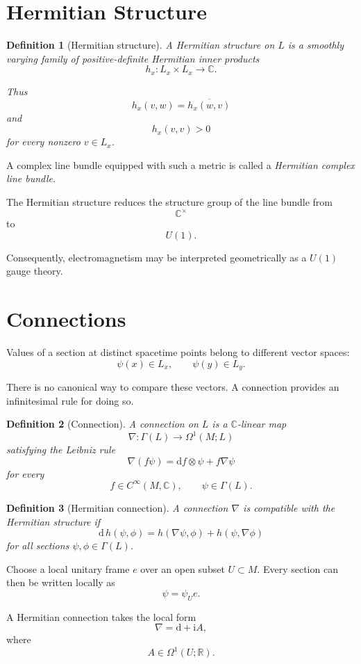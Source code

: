 \documentclass[11pt,a4paper]{article}
\newtheorem{definition}{Definition}[section]
\newcommand{\R}{\mathbb{R}}
\newcommand{\C}{\mathbb{C}}
\newcommand{\ii}{\mathrm{i}}
\newcommand{\dd}{\mathrm{d}}
\begin{document}
\section{Hermitian Structure}

\begin{definition}[Hermitian structure]
A \emph{Hermitian structure} on $L$ is a smoothly varying family of
positive-definite Hermitian inner products
\[
h_x:L_x\times L_x\longrightarrow\C.
\]

Thus
\[
h_x(v,w)=\overline{h_x(w,v)}
\]
and
\[
h_x(v,v)>0
\]
for every nonzero $v\in L_x$.
\end{definition}

A complex line bundle equipped with such a metric is called a
\emph{Hermitian complex line bundle}.

The Hermitian structure reduces the structure group of the line
bundle from
\[
\C^\times
\]
to
\[
U(1).
\]

Consequently, electromagnetism may be interpreted geometrically as
a $U(1)$ gauge theory.

\section{Connections}

Values of a section at distinct spacetime points belong to different
vector spaces:
\[
\psi(x)\in L_x,
\qquad
\psi(y)\in L_y.
\]

There is no canonical way to compare these vectors. A connection
provides an infinitesimal rule for doing so.

\begin{definition}[Connection]
A connection on $L$ is a $\C$-linear map
\[
\nabla:\Gamma(L)
\longrightarrow
\Omega^1(M;L)
\]
satisfying the Leibniz rule
\[
\nabla(f\psi)
=
\dd f\otimes\psi
+
f\nabla\psi
\]
for every
\[
f\in C^\infty(M,\C),
\qquad
\psi\in\Gamma(L).
\]
\end{definition}

\begin{definition}[Hermitian connection]
A connection $\nabla$ is compatible with the Hermitian structure
if
\[
\dd\,h(\psi,\phi)
=
h(\nabla\psi,\phi)
+
h(\psi,\nabla\phi)
\]
for all sections $\psi,\phi\in\Gamma(L)$.
\end{definition}

Choose a local unitary frame $e$ over an open subset $U\subset M$.
Every section can then be written locally as
\[
\psi=\psi_U e.
\]

A Hermitian connection takes the local form
\[
\nabla
=
\dd+\ii A,
\]
where
\[
A\in\Omega^1(U;\R).
\]
\end{document}
